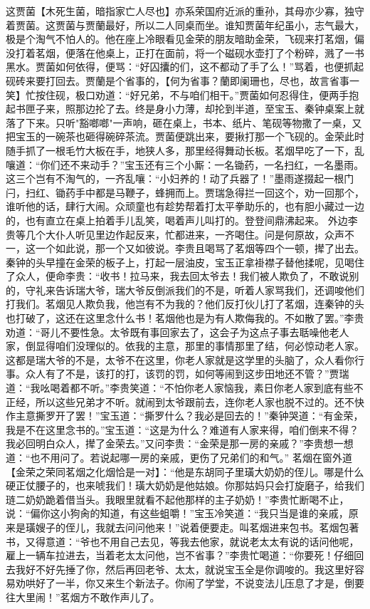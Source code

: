 \documentclass[12pt,oneside]{book}
\begin{document}
这贾菌【木死生菌，暗指家亡人尽也】亦系荣国府近派的重孙，其母亦少寡，独守着贾菌。这贾菌与贾蘭最好，所以二人同桌而坐。谁知贾菌年纪虽小，志气最大，极是个淘气不怕人的。他在座上冷眼看见金荣的朋友暗助金荣，飞砚来打茗烟，偏没打着茗烟，便落在他桌上，正打在面前，将一个磁砚水壶打了个粉碎，溅了一书黑水。贾菌如何依得，便骂：“好囚攮的们，这不都动了手了么！”骂着，也便抓起砚砖来要打回去。贾蘭是个省事的，【何为省事？蘭即阑珊也，尽也，故言省事一笑】忙按住砚，极口劝道：“好兄弟，不与咱们相干。”贾菌如何忍得住，便两手抱起书匣子来，照那边抡了去。终是身小力薄，却抡到半道，至宝玉、秦钟桌案上就落了下来。只听"豁啷啷"一声响，砸在桌上，书本、纸片、笔砚等物撒了一桌，又把宝玉的一碗茶也砸得碗碎茶流。贾菌便跳出来，要揪打那一个飞砚的。金荣此时随手抓了一根毛竹大板在手，地狭人多，那里经得舞动长板。茗烟早吃了一下，乱嚷道：“你们还不来动手？”宝玉还有三个小厮：一名锄药，一名扫红，一名墨雨。这三个岂有不淘气的，一齐乱嚷：“小妇养的！动了兵器了！”墨雨遂掇起一根门闩，扫红、锄药手中都是马鞭子，蜂拥而上。贾瑞急得拦一回这个，劝一回那个，谁听他的话，肆行大闹。众顽童也有趁势帮着打太平拳助乐的，也有胆小藏过一边的，也有直立在桌上拍着手儿乱笑，喝着声儿叫打的。登登间鼎沸起来。
外边李贵等几个大仆人听见里边作起反来，忙都进来，一齐喝住。问是何原故，众声不一，这一个如此说，那一个又如彼说。李贵且喝骂了茗烟等四个一顿，撵了出去。秦钟的头早撞在金荣的板子上，打起一层油皮，宝玉正拿褂襟子替他揉呢，见喝住了众人，便命李贵：“收书！拉马来，我去回太爷去！我们被人欺负了，不敢说别的，守礼来告诉瑞大爷，瑞大爷反倒派我们的不是，听着人家骂我们，还调唆他们打我们。茗烟见人欺负我，他岂有不为我的？他们反打伙儿打了茗烟，连秦钟的头也打破了，这还在这里念什么书！茗烟他也是为有人欺侮我的。不如散了罢。”李贵劝道：“哥儿不要性急。太爷既有事回家去了，这会子为这点子事去聒噪他老人家，倒显得咱们没理似的。依我的主意，那里的事情那里了结，何必惊动老人家。这都是瑞大爷的不是，太爷不在这里，你老人家就是这学里的头脑了，众人看你行事。众人有了不是，该打的打，该罚的罚，如何等闹到这步田地还不管？”贾瑞道：“我吆喝着都不听。”李贵笑道：“不怕你老人家恼我，素日你老人家到底有些不正经，所以这些兄弟才不听。就闹到太爷跟前去，连你老人家也脱不过的。还不快作主意撕罗开了罢！”宝玉道：“撕罗什么？我必是回去的！”秦钟哭道：“有金荣，我是不在这里念书的。”宝玉道：“这是为什么？难道有人家来得，咱们倒来不得？我必回明白众人，撵了金荣去。”又问李贵：“金荣是那一房的亲戚？”李贵想一想道：“也不用问了。若说起哪一房的亲戚，更伤了兄弟们的和气。”
茗烟在窗外道【金荣之荣同茗烟之化烟恰是一对】：“他是东胡同子里璜大奶奶的侄儿。哪是什么硬正仗腰子的，也来唬我们！璜大奶奶是他姑娘。你那姑妈只会打旋磨子，给我们琏二奶奶跪着借当头。我眼里就看不起他那样的主子奶奶！”李贵忙断喝不止，说：“偏你这小狗肏的知道，有这些蛆嚼！”宝玉冷笑道：“我只当是谁的亲戚，原来是璜嫂子的侄儿，我就去问问他来！”说着便要走。叫茗烟进来包书。茗烟包著书，又得意道：“爷也不用自己去见，等我去他家，就说老太太有说的话问他呢，雇上一辆车拉进去，当着老太太问他，岂不省事？”李贵忙喝道：“你要死！仔细回去我好不好先捶了你，然后再回老爷、太太，就说宝玉全是你调唆的。我这里好容易劝哄好了一半，你又来生个新法子。你闹了学堂，不说变法儿压息了才是，倒要往大里闹！”茗烟方不敢作声儿了。
\end{document}
